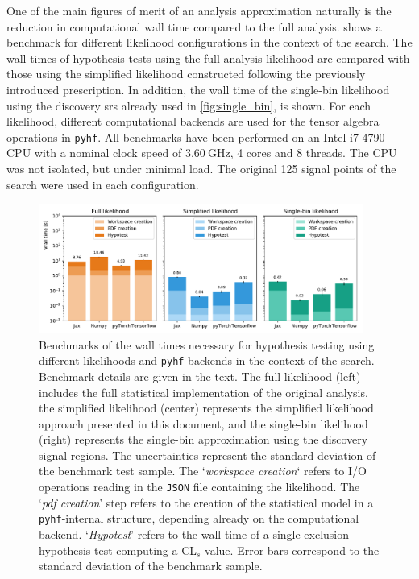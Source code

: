 One of the main figures of merit of an analysis approximation naturally is the reduction in computational wall time compared to the full analysis.  shows a benchmark for different likelihood configurations in the context of the \onelepton search.
The wall times of hypothesis tests using the full analysis likelihood are compared with those using the simplified likelihood constructed following the previously introduced prescription.
In addition, the wall time of the single-bin likelihood using the discovery \glspl{sr} already used in \cref{fig:single_bin}, is shown.
For each likelihood, different computational backends are used for the tensor algebra operations in \texttt{pyhf}. All benchmarks have been performed on an Intel i7-4790 CPU with a nominal clock speed of $\SI{3.60}{\GHz}$, 4 cores and 8 threads.
The CPU was not isolated, but under minimal load.
The original 125 signal points of the \onelepton search were used in each configuration.

\begin{figure}
	\centering    
	\includegraphics[width=0.95\textwidth]{benchmark_1Lbb}
	\caption{Benchmarks of the wall times necessary for hypothesis testing using different likelihoods and \texttt{pyhf} backends in the context of the \onelepton search. Benchmark details are given in the text. The full likelihood (left) includes the full statistical implementation of the original analysis, the simplified likelihood (center) represents the simplified likelihood approach presented in this document, and the single-bin likelihood (right) represents the single-bin approximation using the discovery signal regions. The uncertainties represent the standard deviation of the benchmark test sample. The `\textit{workspace creation}` refers to I/O operations reading in the \texttt{JSON} file containing the likelihood. The `\textit{pdf creation}' step refers to the creation of the statistical model in a \texttt{pyhf}-internal structure, depending already on the computational backend. `\textit{Hypotest}' refers to the wall time of a single exclusion hypothesis test computing a CL$_s$ value. Error bars correspond to the standard deviation of the benchmark sample.}\label{fig:benchmark}
	\label{fig:benchmark_1Lbb}
\end{figure}


